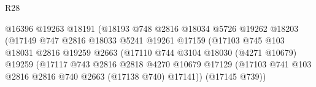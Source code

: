 \begin{lexlean}{R28}
\begin{coremodule}
                                          @16396
                                          @19263
                                          @18191
                                          (@18193
                                            @748
                                            @2816
                                            @18034
                                            @5726
                                            @19262
                                            @18203
                                            (@17149
                                              @747
                                              @2816
                                              @18033
                                              @5241
                                              @19261
                                              @17159
                                              (@17103
                                                @745
                                                @103
                                                @18031
                                                @2816
                                                @19259
                                                @2663
                                                (@17110
                                                  @744
                                                  @3104
                                                  @18030
                                                  (@4271 @10679)
                                                  @19259
                                                  (@17117
                                                    @743
                                                    @2816
                                                    @2818
                                                    @4270
                                                    @10679
                                                    @17129
                                                    (@17103
                                                      @741
                                                      @103
                                                      @2816
                                                      @2816
                                                      @740
                                                      @2663
                                                      (@17138 @740)
                                                      @17141))
                                                  (@17145 @739))

\end{coremodule}
\end{lexlean}
